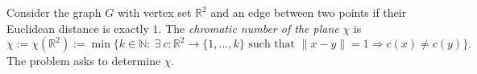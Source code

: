 Consider the graph $G$ with vertex set $\mathbb R^2$ and an edge between two points if their Euclidean distance is exactly $1$.
The \emph{chromatic number of the plane} $\chi$ is
\[
\chi := \chi(\mathbb R^2) := \min\big\{k\in\mathbb N:\ \exists\ c:\mathbb R^2\to\{1,\dots,k\}\text{ such that }\lVert x-y\rVert=1\Rightarrow c(x)\ne c(y)\big\}.
\]
The problem asks to determine $\chi$.

